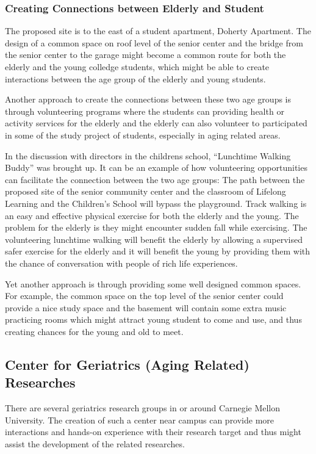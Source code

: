 \subsubsection{Creating Connections between Elderly and Student}
The proposed site is to the east of a student apartment, Doherty
Apartment. The design of a common space on roof level of the senior
center and the bridge from the senior center to the garage might
become a common route for both the elderly and the young colledge
students, which might be able to create interactions between the age
group of the elderly and young students.

Another approach to create the connections between these two age
groups is through volunteering programs where the students can
providing health or activity services for the elderly and the elderly
can also volunteer to participated in some of the study project of
students, especially in aging related areas.

In the discussion with directors in the childrens school, ``Lunchtime
Walking Buddy'' was brought up. It can be an example of how
volunteering opportunities can facilitate the connection between the
two age groups: The path between the proposed site of the senior
community center and the classroom of Lifelong Learning and the
Children's School will bypass the playground. Track walking is an easy
and effective physical exercise for both the elderly and the young. The
problem for the elderly is they might encounter sudden fall while
exercising. The volunteering lunchtime walking will benefit the
elderly by allowing a supervised safer exercise for the elderly and it
will benefit the young by providing them with the chance of
conversation with people of rich life experiences.

Yet another approach is through providing some well designed common
spaces. For example, the common space on the top level of the senior
center could provide a nice study space and the basement will contain
some extra music practicing rooms which might attract young student to
come and use, and thus creating chances for the young and old to meet.

\subsection{Center for Geriatrics (Aging Related) Researches}
There are several geriatrics research groups in or around Carnegie
Mellon University. The creation of such a center near campus can
provide more interactions and hands-on experience with their research
target and thus might assist the development of the related
researches.

